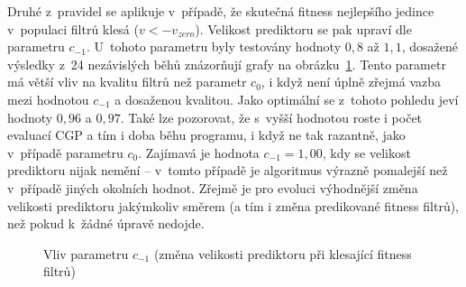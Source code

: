 Druhé z~pravidel se aplikuje v~případě, že skutečná fitness nejlepšího jedince v~populaci filtrů klesá ($v < -v_\mathit{zero}$). Velikost prediktoru se pak upraví dle parametru $c_{-1}$. U~tohoto parametru byly testovány hodnoty $0,8$ až $1,1$, dosažené výsledky z~24 nezávislých běhů znázorňují grafy na obrázku~\ref{plotDecrcoef-30kg}. Tento parametr má větší vliv na kvalitu filtrů než parametr $c_0$, i když není úplně zřejmá vazba mezi hodnotou $c_{-1}$ a dosaženou kvalitou. Jako optimální se z~tohoto pohledu jeví hodnoty $0,96$ a $0,97$. Také lze pozorovat, že s~vyšší hodnotou roste i počet evaluací CGP a tím i doba běhu programu, i když ne tak razantně, jako v~případě parametru $c_0$. Zajímavá je hodnota $c_{-1} = 1,00$, kdy se velikost prediktoru nijak nemění -- v~tomto případě je algoritmus výrazně pomalejší než v~případě jiných okolních hodnot. Zřejmě je pro evoluci výhodnější změna velikosti prediktoru jakýmkoliv směrem (a tím i změna predikované fitness filtrů), než pokud k~žádné úpravě nedojde.

\begin{figure}[tbp]
    \centering
    \baselineskip
    \caption{Vliv parametru $c_{-1}$ (změna velikosti prediktoru při klesající fitness filtrů)}
    \label{plotDecrcoef-30kg}
\end{figure}

